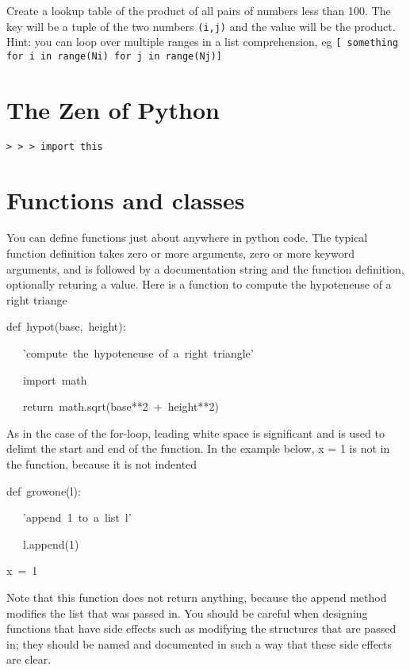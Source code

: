 \begin{xca}
Create a lookup table of the product of all pairs of numbers less
than 100. The key will be a tuple of the two numbers \texttt{(i,j)}
and the value will be the product. Hint: you can loop over multiple
ranges in a list comprehension, eg \texttt{{[} something for i in
range(Ni) for j in range(Nj)]}
\end{xca}

\section[Zen]{The Zen of Python}

\begin{xca}
\texttt{>\,{}>\,{}> import this}
\end{xca}

\section{Functions and classes}

You can define functions just about anywhere in python code. The typical
function definition takes zero or more arguments, zero or more keyword
arguments, and is followed by a documentation string and the function
definition, optionally returing a value. Here is a function to compute
the hypoteneuse of a right triange

\begin{lyxcode}
def~hypot(base,~height):

~~~'compute~the~hypoteneuse~of~a~right~triangle'

~~~import~math

~~~return~math.sqrt(base{*}{*}2~+~height{*}{*}2)
\end{lyxcode}
As in the case of the for-loop, leading white space is significant
and is used to delimt the start and end of the function. In the example
below, x = 1 is not in the function, because it is not indented

\begin{lyxcode}
def~growone(l):

~~~'append~1~to~a~list~l'

~~~l.append(1)

x~=~1
\end{lyxcode}
Note that this function does not return anything, because the append
method modifies the list that was passed in. You should be careful
when designing functions that have side effects such as modifying
the structures that are passed in; they should be named and documented
in such a way that these side effects are clear.

